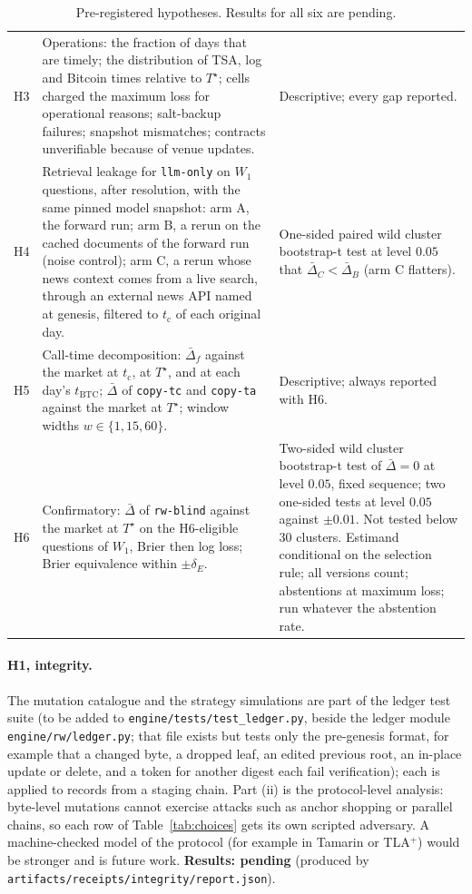 \documentclass[11pt]{article}
\newcommand{\Ts}{T^{\star}}
\newcommand{\tc}{t_{\mathrm{c}}}
\newcommand{\pending}[1]{\textbf{Results: pending} (produced by \nolinkurl{#1}).}
\begin{document}
\begin{table}[t]
\begin{tabularx}{\textwidth}{@{}l>{\raggedright\arraybackslash}X>{\raggedright\arraybackslash}X@{}}
H3 & Operations: the fraction of days that are timely; the distribution of TSA, log and Bitcoin times relative to $\Ts$; cells charged the maximum loss for operational reasons; salt-backup failures; snapshot mismatches; contracts unverifiable because of venue updates. & Descriptive; every gap reported. \\
H4 & Retrieval leakage for \texttt{llm-only} on $W_1$ questions, after resolution, with the same pinned model snapshot: arm A, the forward run; arm B, a rerun on the cached documents of the forward run (noise control); arm C, a rerun whose news context comes from a live search, through an external news API named at genesis, filtered to $\tc$ of each original day. & One-sided paired wild cluster bootstrap-t test at level $0.05$ that $\bar\Delta_C < \bar\Delta_B$ (arm C flatters). \\
H5 & Call-time decomposition: $\bar\Delta_f$ against the market at $\tc$, at $\Ts$, and at each day's $t_{\mathrm{BTC}}$; $\bar\Delta$ of \texttt{copy-tc} and \texttt{copy-ta} against the market at $\Ts$; window widths $w \in \{1, 15, 60\}$. & Descriptive; always reported with H6. \\
H6 & Confirmatory: $\bar\Delta$ of \texttt{rw-blind} against the market at $\Ts$ on the H6-eligible questions of $W_1$, Brier then log loss; Brier equivalence within $\pm\delta_E$. & Two-sided wild cluster bootstrap-t test of $\bar\Delta = 0$ at level $0.05$, fixed sequence; two one-sided tests at level $0.05$ against $\pm 0.01$. Not tested below 30 clusters. Estimand conditional on the selection rule; all versions count; abstentions at maximum loss; run whatever the abstention rate. \\
\bottomrule
\end{tabularx}
\caption{Pre-registered hypotheses. Results for all six are pending.}
\label{tab:hyp}
\end{table}

\paragraph{H1, integrity.} The mutation catalogue and the strategy simulations are part of the ledger test suite (to be added to \nolinkurl{engine/tests/test_ledger.py}, beside the ledger module \nolinkurl{engine/rw/ledger.py}; that file exists but tests only the pre-genesis format, for example that a changed byte, a dropped leaf, an edited previous root, an in-place update or delete, and a token for another digest each fail verification); each is applied to records from a staging chain. Part (ii) is the protocol-level analysis: byte-level mutations cannot exercise attacks such as anchor shopping or parallel chains, so each row of Table~\ref{tab:choices} gets its own scripted adversary. A machine-checked model of the protocol (for example in Tamarin or TLA$^+$) would be stronger and is future work. \pending{artifacts/receipts/integrity/report.json}
\end{document}
